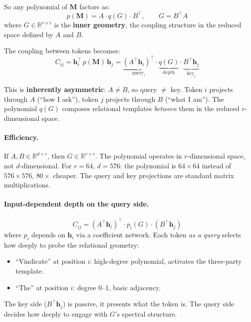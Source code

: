 \documentclass[11pt, a4paper]{article}
\newcommand{\M}{\mathbf{M}}
\newcommand{\h}{\mathbf{h}}
\newcommand{\R}{\mathbb{R}}
\theoremstyle{plain}
\theoremstyle{definition}
\theoremstyle{remark}
\begin{document}
So any polynomial of $\M$ factors as:
\begin{equation}
p(\M) = A \cdot q(G) \cdot B^\top, \qquad G = B^\top A
\end{equation}
where $G \in \R^{r \times r}$ is the \textbf{inner geometry}, the coupling structure in the reduced space defined by $A$ and $B$.

The coupling between tokens becomes:
\begin{equation}
C_{ij} = \h_i^\top \, p(\M) \, \h_j
       = \underbrace{(A^\top \h_i)^\top}_{\text{query}_i} \cdot \underbrace{q(G)}_{\text{depth}} \cdot \underbrace{B^\top \h_j}_{\text{key}_j}
\end{equation}

This is \textbf{inherently asymmetric}: $A \neq B$, so query $\neq$ key.
Token $i$ projects through $A$ (``how I ask''), token $j$ projects through $B$ (``what I am'').
The polynomial $q(G)$ composes relational templates \emph{between} them in the reduced $r$-dimensional space.

\paragraph{Efficiency.}
If $A, B \in \R^{d \times r}$, then $G \in \R^{r \times r}$.
The polynomial operates in $r$-dimensional space, not $d$-dimensional.
For $r = 64$, $d = 576$: the polynomial is $64 \times 64$ instead of $576 \times 576$, $80\times$ cheaper.
The query and key projections are standard matrix multiplications.

\paragraph{Input-dependent depth on the query side.}
\begin{equation}
C_{ij} = (A^\top \h_i)^\top \cdot p_i(G) \cdot (B^\top \h_j)
\end{equation}
where $p_i$ depends on $\h_i$ via a coefficient network.
Each token \emph{as a query} selects how deeply to probe the relational geometry:
\begin{itemize}[nosep]
\item ``Vindicate'' at position $i$: high-degree polynomial, activates the three-party template.
\item ``The'' at position $i$: degree 0--1, basic adjacency.
\end{itemize}
The key side ($B^\top \h_j$) is passive, it presents what the token is.
The query side decides how deeply to engage with $G$'s spectral structure.
\end{document}
